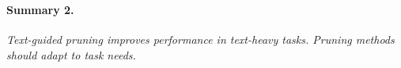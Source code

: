 
\vspace{-2mm}
\begin{takeaways}
\ \paragraph{Summary 2.} 
    \emph{Text-guided pruning improves performance in text-heavy tasks. Pruning methods should adapt to task needs.}
\end{takeaways}

